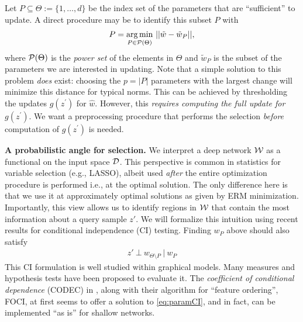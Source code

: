 Let $P \subseteq \Theta:= \{1,\ldots, d\}$ be the index set of the parameters that are ``sufficient'' to update. A direct procedure may be to identify this subset $P$ with
\begin{align}\label{eq:normsel}
P = \underset{P \in \mathcal{P}(\Theta)}{\arg\min} \ ||\tilde{w} - \tilde{w}_P||,
\end{align}
where $\mathcal{P}(\Theta)$ is the {\em power set} of the elements in $\Theta$ and $\tilde{w}_P$ is the subset of the parameters we are interested in updating. 
Note that a simple solution to this problem {\em does} exist: choosing the $p=|P|$ parameters with the largest change will minimize this distance for typical norms. This can be achieved by thresholding the updates $g(z^\prime)$ for $\hat{w}$. However, this \textit{requires computing the full update for $g(z^\prime)$}. We want a preprocessing procedure that performs the selection \textit{before} computation of $g(z^\prime)$ is needed.

\noindent\textbf{A probabilistic angle for selection.} 
We interpret a deep network $\mathcal{W}$ as a functional on the input space $\mathcal{D}$. This perspective is common in statistics for variable selection (e.g., LASSO), albeit used {\em after} the entire optimization procedure is performed i.e., at the optimal solution. The only difference here is that we use it at approximately optimal solutions as given by ERM minimization. Importantly, this view allows us to identify regions in $\mathcal{W}$ that contain the most information about a query sample $z'$. 
We will formalize this intuition using recent results for conditional independence (CI) testing.
Finding $w_P$ above should also satisfy
\begin{align}\label{eq:paramCI}
    z'\ \bot\ w_{\Theta\setminus P}\ |\ w_P
\end{align}
This CI formulation is well studied within graphical models. Many measures and hypothesis tests have been proposed to evaluate it.
The {\em coefficient of conditional dependence} (CODEC)  in \cite{codec}, along with their algorithm for ``feature ordering'', FOCI, at first seems to offer a solution to  \eqref{eq:paramCI}, and in fact, can be implemented ``as is'' for shallow networks.

